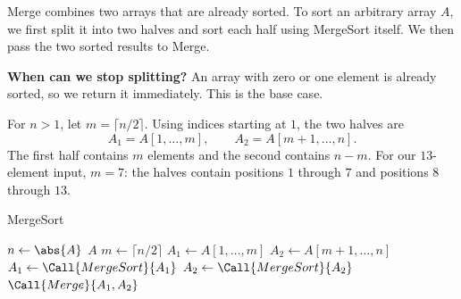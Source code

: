 \documentclass[a4paper,12pt,oneside]{report}
\begin{document}
Merge combines two arrays that are already sorted. To sort an arbitrary
array $A$, we first split it into two halves and sort each half using
MergeSort itself. We then pass the two sorted results to Merge.

\textbf{When can we stop splitting?} An array with zero or one element
is already sorted, so we return it immediately. This is the base case.

For $n>1$, let $m=\lceil n/2\rceil$. Using indices starting at $1$,
the two halves are
\[
  A_1=A[1,\ldots,m],\qquad A_2=A[m+1,\ldots,n].
\]
The first half contains $m$ elements and the second contains $n-m$.
For our $13$-element input, $m=7$: the halves contain positions
$1$ through $7$ and positions $8$ through $13$.

\begin{framedalgo}{MergeSort}\label{alg:mergesort}
\begin{algorithmic}[1]
    \State $n\gets\abs{A}$ 
     
      \State \Return $A$ 
    \EndIf
    \State $m\gets\lceil n/2\rceil$ 
    \State $A_1\gets A[1,\ldots,m]$ 
    \State $A_2\gets A[m+1,\ldots,n]$ 
    \State $A_1\gets\Call{MergeSort}{A_1}$ 
    \State $A_2\gets\Call{MergeSort}{A_2}$ 
    \State \Return $\Call{Merge}{A_1,A_2}$ 
  \EndFunction
\end{algorithmic}
\end{framedalgo}
\end{document}
